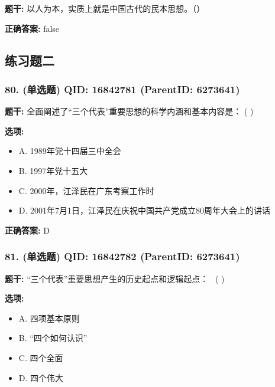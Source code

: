 \documentclass[12pt,UTF8]{ctexart}
\begin{document}
\textbf{题干:}
以人为本，实质上就是中国古代的民本思想。（）



\textbf{正确答案:}
false

\vspace{0.3em}\hrulefill\vspace{0.7em}

\subsection*{练习题二}

\subsubsection*{80. (单选题) \small QID: 16842781 (ParentID: 6273641)}

\textbf{题干:}
全面阐述了“三个代表”重要思想的科学内涵和基本内容是： ( )



\textbf{选项:}
\begin{itemize}[leftmargin=*]

  \item A. 1989年党十四届三中全会

  \item B. 1997年党十五大

  \item C. 2000年，江泽民在广东考察工作时

  \item D. 2001年7月1日，江泽民在庆祝中国共产党成立80周年大会上的讲话

\end{itemize}

\textbf{正确答案:}
D

\vspace{0.3em}\hrulefill\vspace{0.7em}

\subsubsection*{81. (单选题) \small QID: 16842782 (ParentID: 6273641)}

\textbf{题干:}
“三个代表”重要思想产生的历史起点和逻辑起点：  ( )



\textbf{选项:}
\begin{itemize}[leftmargin=*]

  \item A. 四项基本原则

  \item B. “四个如何认识”

  \item C. 四个全面

  \item D. 四个伟大

\end{itemize}
\end{document}
